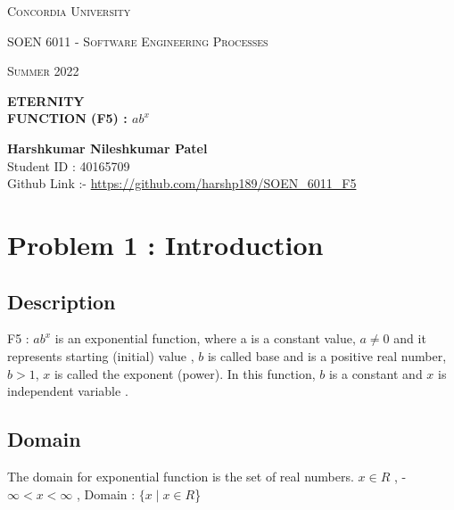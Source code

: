 \documentclass[12pt, a4paper]{article}
\begin{document}
\begin{titlepage}
	\centering
	\vspace*{0.5 cm}
	\begin{center}    \textsc{\Large Concordia University}\\[2.0 cm]	\end{center}
	\textsc{\Large  SOEN 6011 - Software Engineering Processes }\\[0.5 cm]
	\begin{center} \textsc{\Large Summer 2022} \end{center}
	
	\vspace{15mm}
	
	{ \huge \textbf {ETERNITY}}\\[0.2 cm]
	{ \large \textbf{FUNCTION (F5) : $ab^x$}}
	
	\vspace{90mm}	
	\begin{center}   
		{\large \textbf{Harshkumar Nileshkumar Patel}  }\\[0.2 cm]
		{\large Student ID : 40165709 }\\[0.2 cm]
		\vspace{10mm}
		{\large Github Link :- \url{https://github.com/harshp189/SOEN\_6011\_F5}}
	\end{center}
		
\end{titlepage}
\tableofcontents
\newpage

\section{Problem 1 : Introduction}
\subsection{Description}

F5 : $ab^x$ is an exponential function, where a is a constant value, $a \ne 0$ and it represents starting (initial) value , $b$ is called base and is a positive real number, $b > 1$, $x$ is called the exponent (power). In this function, $b$ is a constant and $x$ is  independent variable \cite{Exponential Growth and Decay}.

\subsection{Domain}

The domain for exponential function is the set of real numbers. 
\newline $ x \in R $ ,  -$ \infty < x <\infty $ , Domain : $ \{x \mid x \in R $\}
\end{document}
